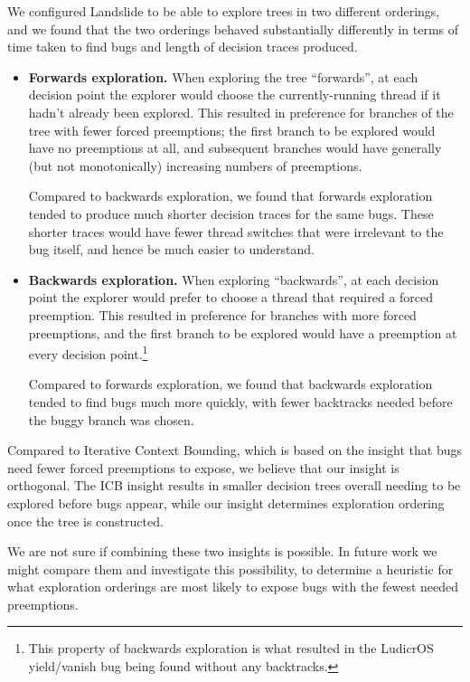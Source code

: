 We configured Landslide to be able to explore trees in two different orderings, and we found that the two orderings behaved substantially differently in terms of time taken to find bugs and length of decision traces produced.

\begin{itemize}
	\item {\bf Forwards exploration.} When exploring the tree ``forwards'', at each decision point the explorer would choose the currently-running thread if it hadn't already been explored. This resulted in preference for branches of the tree with fewer forced preemptions; the first branch to be explored would have no preemptions at all, and subsequent branches would have generally (but not monotonically) increasing numbers of preemptions.

		Compared to backwards exploration, we found that forwards exploration tended to produce much shorter decision traces for the same bugs. These shorter traces would have fewer thread switches that were irrelevant to the bug itself, and hence be much easier to understand.
	\item {\bf Backwards exploration.} When exploring ``backwards'', at each decision point the explorer would prefer to choose a thread that required a forced preemption. This resulted in preference for branches with more forced preemptions, and the first branch to be explored would have a preemption at every decision point.\footnote{
		This property of backwards exploration is what resulted in the LudicrOS yield/vanish bug being found without any backtracks.}

		Compared to forwards exploration, we found that backwards exploration tended to find bugs much more quickly, with fewer backtracks needed before the buggy branch was chosen.
\end{itemize}

Compared to Iterative Context Bounding\cite{chess}, which is based on the insight that bugs need fewer forced preemptions to expose, we believe that our insight is orthogonal. The ICB insight results in smaller decision trees overall needing to be explored before bugs appear, while our insight determines exploration ordering once the tree is constructed.

We are not sure if combining these two insights is possible. In future work we might compare them and investigate this possibility, to determine a heuristic for what exploration orderings are most likely to expose bugs with the fewest needed preemptions.

